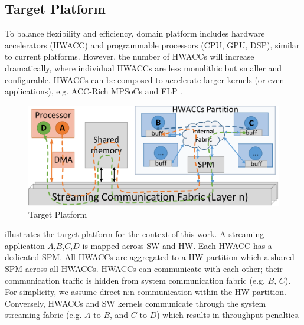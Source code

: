 \subsection{Target Platform}
\label{sec:Platform}

To balance flexibility and efficiency, domain platform includes hardware accelerators (HWACC) and programmable processors (CPU, GPU, DSP), similar to current platforms. However, the number of HWACCs will increase dramatically, where individual HWACCs are less monolithic but smaller and configurable. HWACCs can be composed to accelerate larger kernels (or even applications), e.g. ACC-Rich MPSoCs \cite{cong2014accelerator} and FLP \cite{tabkhi2014function}. 

\begin{figure}[h]
	\centering
	\includegraphics[width=.65\linewidth]{fig/pPlat.pdf}
	\caption{Target Platform}
	\label{fig:plat}
	\vspace{-4pt}
\end{figure}

 illustrates the target platform for the context of this work. A streaming application $A$,$B$,$C$,$D$ is mapped across SW and HW. Each HWACC has a dedicated SPM. All HWACCs are aggregated to a HW partition which a shared SPM across all HWACCs. HWACCs can communicate with each other; their communication traffic is hidden from system communication fabric (e.g. $B$, $C$). For simplicity, we assume direct n:n communication within the HW partition. Conversely, HWACCs and SW kernels communicate through the system streaming fabric (e.g. $A$ to $B$, and $C$ to $D$) which results in throughput penalties. 